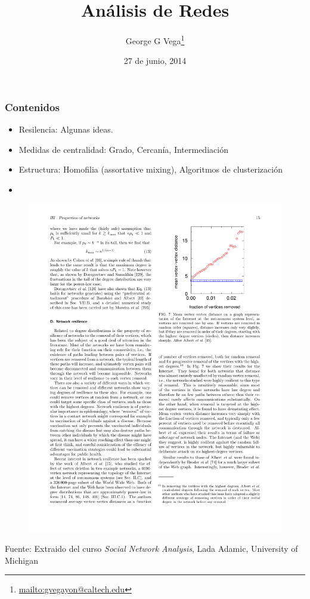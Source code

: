 \documentclass[10pt]{beamer}
\author{George G Vega\thanks{\url{mailto:gvegayon@caltech.edu}}}
\institute{Superintendencia de Pensiones}
\title{An\'alisis de Redes}
\date{27 de junio, 2014}
\begin{document}
\frame{\maketitle}

\begin{frame}
\frametitle{Contenidos}
\tableofcontents
\end{frame}

\begin{frame}
\begin{itemize}
\item Resilencia: Algunas ideas.
\item Medidas de centralidad: Grado, Cercan\'ia, Intermediaci\'on
\item Estructura: Homofilia (assortative mixing), Algoritmos de clusterizaci\'on
\item 
\end{itemize}
\end{frame}

\begin{frame}
\begin{figure}
\includegraphics[trim=11cm 16cm 1.5cm 1.5cm, clip=true, width=.6\linewidth]{newman_network_resilense.pdf}
\end{figure}
{\footnotesize Fuente: Extraido del curso \emph{Social Network Analysis}, Lada
Adamic, University of Michigan \cite{lada2014}}
\end{frame}
\end{document}
